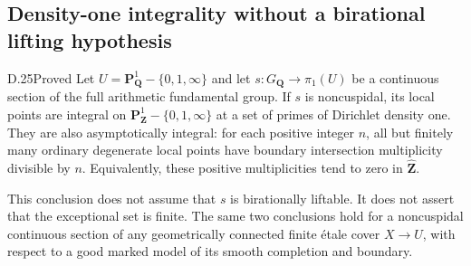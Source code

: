 \subsection{Density-one integrality without a birational lifting hypothesis}

\begin{claim}{D.25}{Proved}\label{clm:D25}
Let $U=\mathbf P^1_{\mathbf Q}-\{0,1,\infty\}$ and let
$s:G_{\mathbf Q}\to\pi_1(U)$ be a continuous section of the full
arithmetic fundamental group.  If $s$ is noncuspidal, its local
points are integral on
$\mathbf P^1_{\mathbf Z}-\{0,1,\infty\}$ at a set of primes of
Dirichlet density one.  They are also asymptotically integral:
for each positive integer $n$, all but finitely many ordinary
degenerate local points have boundary intersection multiplicity
divisible by $n$.  Equivalently, these positive multiplicities
tend to zero in $\widehat{\mathbf Z}$.

This conclusion does not assume that $s$ is birationally liftable.
It does not assert that the exceptional set is finite.
The same two conclusions hold for a noncuspidal continuous section
of any geometrically connected finite étale cover $X\to U$, with
respect to a good marked model of its smooth completion and boundary.
\end{claim}
